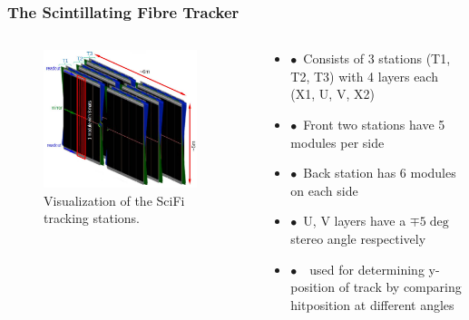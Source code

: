 \documentclass[aspectratio=1610, 12pt]{beamer}
\begin{document}
\begin{frame}\frametitle{The Scintillating Fibre Tracker}
  \begin{columns}
    \begin{column}[c]{0.48\textwidth}
      \begin{figure}
        \includegraphics[width=0.9\textwidth]{logos/scifi.png}
        \caption{Visualization of the SciFi tracking stations.}
      \end{figure}
    \end{column}
    \begin{column}{0.48\textwidth}
      \begin{itemize}
        \item $\bullet$\, Consists of 3 stations (T1, T2, T3) with 4 layers each (X1, U, V, X2)
        \item $\bullet$\, Front two stations have 5 modules per side
        \item $\bullet$\, Back station has 6 modules on each side
        \item $\bullet$\, U, V layers have a $\mp 5 \deg$ stereo angle respectively
        \item $\bullet$\, \to\, used for determining y-position of track by comparing hitposition at different angles
      \end{itemize}
    \end{column}
  \end{columns}
\end{frame}
\end{document}
